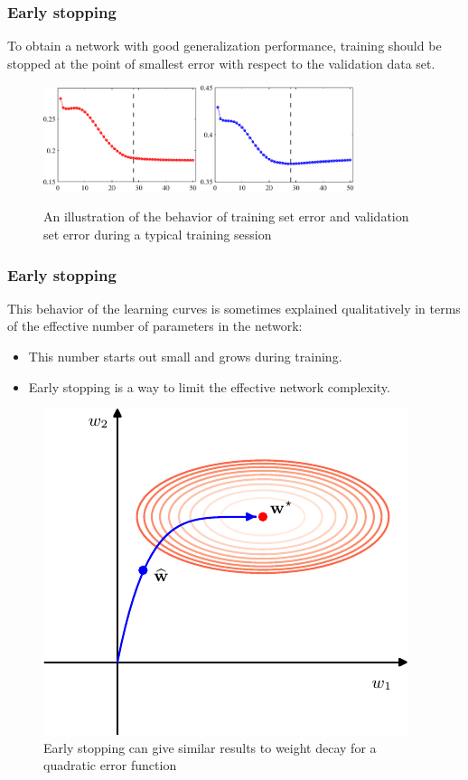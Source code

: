 \documentclass{beamer}
\begin{document}
\begin{frame}
    \frametitle{Early stopping}
    To obtain a network with good generalization performance, training should be stopped at the point of smallest error with respect to the validation data set.
    \begin{figure}
        \caption{An illustration of the behavior of training set error and validation set error during a typical training session}
        \includegraphics[width=0.4\textwidth]{Figure_7_a.pdf}
        \includegraphics[width=0.4\textwidth]{Figure_7_b.pdf}
    \end{figure}
\end{frame}

\begin{frame}
    \frametitle{Early stopping}
    This behavior of the learning curves is sometimes explained qualitatively in terms of the effective number of parameters in the network:
    \begin{itemize}
        \item This number starts out small and grows during training.
        \item Early stopping is a way to limit the effective network complexity.
    \end{itemize}
    \begin{figure}
        \caption{Early stopping can give similar results to weight decay for a quadratic error function}
        \includegraphics[height=0.4\textheight]{Figure_8.pdf}
    \end{figure}
\end{frame}
\end{document}
